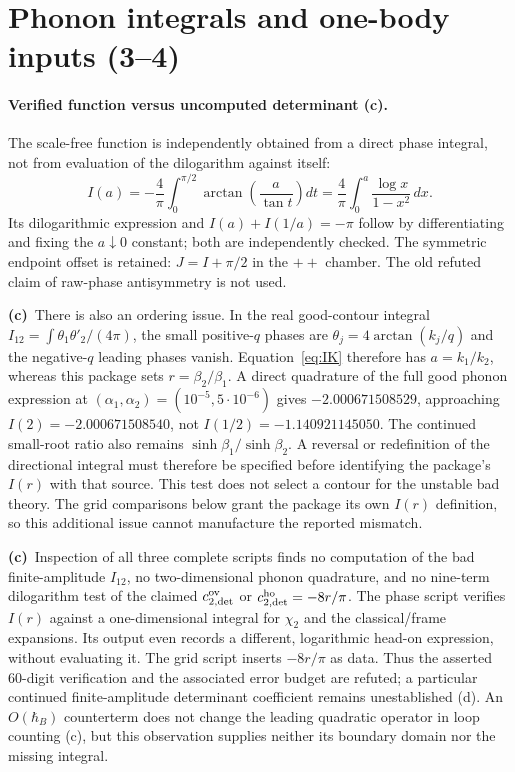 \documentclass[11pt,a4paper]{article}
\newcommand{\Lc}{\textbf{(c)}\ }
\begin{document}
\section{Phonon integrals and one-body inputs (3--4)}
\paragraph{Verified function versus uncomputed determinant (c).}
The scale-free function is independently obtained from a direct phase
integral, not from evaluation of the dilogarithm against itself:
\begin{equation}
 I(a)=-\frac4\pi\int_0^{\pi/2}
        \arctan\!\left(\frac{a}{\tan t}\right)dt
 =\frac4\pi\int_0^a\frac{\log x}{1-x^2}\,dx.
 \label{eq:IK}
\end{equation}
Its dilogarithmic expression and $I(a)+I(1/a)=-\pi$ follow by differentiating
and fixing the $a\downarrow0$ constant; both are independently checked.
The symmetric endpoint offset is retained: $J=I+\pi/2$ in the $++$ chamber.
The old refuted claim of raw-phase antisymmetry is not used.

\Lc There is also an ordering issue. In the real good-contour integral
$I_{12}=\int\theta_1\theta'_2/(4\pi)$, the small positive-$q$ phases are
$\theta_j=4\arctan(k_j/q)$ and the negative-$q$ leading phases vanish.
Equation~\eqref{eq:IK} therefore has $a=k_1/k_2$, whereas this package sets
$r=\beta_2/\beta_1$. A direct quadrature of the full good phonon expression
at $(\alpha_1,\alpha_2)=(10^{-5},5\cdot10^{-6})$ gives
$-2.000671508529$, approaching $I(2)=-2.000671508540$, not
$I(1/2)=-1.140921145050$. The continued small-root ratio also remains
$\sinh\beta_1/\sinh\beta_2$. A reversal or redefinition of the directional
integral must therefore be specified before identifying the package's $I(r)$
with that source. This test does not select a contour for the unstable bad
theory. The grid comparisons below grant the package its own $I(r)$ definition,
so this additional issue cannot manufacture the reported mismatch.

\Lc Inspection of all three complete scripts finds no computation of the
bad finite-amplitude $I_{12}$, no two-dimensional phonon quadrature, and no
nine-term dilogarithm test of the claimed
$c_{2,\rm det}^{\rm ov}$ or $c_{2,\rm det}^{\rm ho}=-8r/\pi$.
The phase script verifies $I(r)$ against a one-dimensional integral for
$\chi_2$ and the classical/frame expansions. Its output even records a
different, logarithmic head-on expression, without evaluating it.
The grid script inserts $-8r/\pi$ as data. Thus the asserted 60-digit
verification and the associated error budget are refuted; a particular
continued finite-amplitude determinant coefficient remains unestablished (d).
An $O(\hbar_B)$ counterterm does not change the leading quadratic operator
in loop counting (c), but this observation supplies neither its boundary
domain nor the missing integral.
\end{document}
